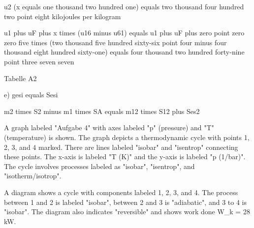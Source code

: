 u2 (x equals one thousand two hundred one) equals two thousand four hundred two point eight kilojoules per kilogram  

u1 plus uF plus x times (u16 minus u61) equals u1 plus uF plus zero point zero zero five times (two thousand five hundred sixty-six point four minus four thousand eight hundred sixty-one) equals four thousand two hundred forty-nine point three seven seven  

Tabelle A2  

e) gesi equals Sesi  

m2 times S2 minus m1 times SA equals m12 times S12 plus Ses2

A graph labeled "Aufgabe 4" with axes labeled "p" (pressure) and "T" (temperature) is shown. The graph depicts a thermodynamic cycle with points 1, 2, 3, and 4 marked. There are lines labeled "isobar" and "isentrop" connecting these points. The x-axis is labeled "T (K)" and the y-axis is labeled "p (1/bar)". The cycle involves processes labeled as "isobar", "isentrop", and "isotherm/isotrop".

A diagram shows a cycle with components labeled 1, 2, 3, and 4. The process between 1 and 2 is labeled "isobar", between 2 and 3 is "adiabatic", and 3 to 4 is "isobar". The diagram also indicates "reversible" and shows work done W_k = 28 kW.